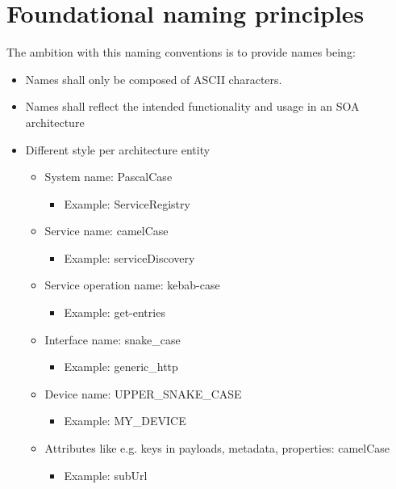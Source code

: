 \documentclass[a4paper]{arrowhead}
\begin{document}
\section{Foundational naming principles}
\label{sec:principles}
The ambition with this naming conventions is to provide names being:
\begin{itemize}

\item Names shall only be composed of ASCII characters.

\item Names shall reflect the intended functionality and usage in an
  SOA architecture
  
\item Different style per architecture entity
  \begin{itemize}
  \item System name: PascalCase
    \begin{itemize}
    \item Example: ServiceRegistry
    \end{itemize}

  \item Service name: camelCase
  \begin{itemize}
    \item Example: serviceDiscovery
    \end{itemize}

  \item Service operation name: kebab-case
  \begin{itemize}
    \item Example: get-entries
    \end{itemize}

  \item Interface name: snake\_case
    \begin{itemize}
    \item Example: generic\_http
    \end{itemize}

  \item Device name: UPPER\_SNAKE\_CASE
  \begin{itemize}
    \item Example: MY\_DEVICE
    \end{itemize}
    
  \item Attributes like e.g. keys in payloads, metadata, properties: camelCase
   \begin{itemize}
    \item Example: subUrl
    \end{itemize}
 \end{itemize}


\end{itemize}
\end{document}
